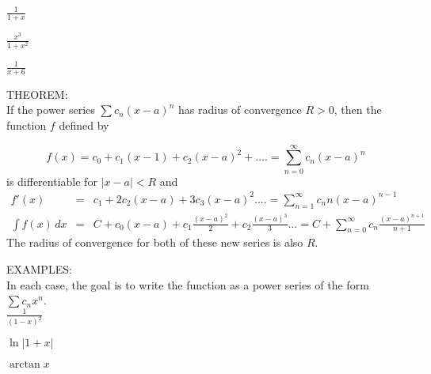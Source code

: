 \documentclass[11pt]{article}
\begin{document}
$\frac{1}{1+x}$

\vspace{1.5in}

$\frac{x^3}{1+x^2}$

\vspace{1.5in}

$\frac{1}{x+6}$


\pagebreak

THEOREM: \\
If the power series $\sum c_n(x-a)^n$ has radius of convergence $R>0$,
then the function $f$ defined by 

\begin{displaymath}
f(x) = c_0 + c_1(x-1) + c_2(x-a)^2 + .... = \sum_{n=0}^{\infty}c_n(x-a)^n 
  \end{displaymath}
is differentiable for $|x-a|<R$ and 
\begin{eqnarray*}
f'(x) &=& c_1 + 2c_2(x-a) +  3c_3(x-a)^2.... = \sum_{n=1}^{\infty}c_nn(x-a)^{n-1} \\
\int f(x)\,dx &=& C + c_0(x-a) + c_1\frac{(x-a)^2}{2} + c_2\frac{(x-a)^3}{3}...  = C + \sum_{n=0}^{\infty}c_n\frac{(x-a)^{n+1}}{n+1}
  \end{eqnarray*}
The radius of convergence for both of these new series is also $R$.

\vspace{.5in}

EXAMPLES: \\

In each case, the goal is to write the function as a power series of the form $\sum c_nx^n$.\\

$\frac{1}{(1-x)^2}$

\vspace{2in}

$\ln{|1+x|}$

\vspace{2in}

$\arctan{x}$
\end{document}
